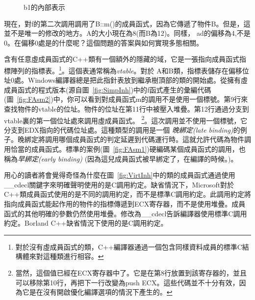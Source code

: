 \begin{figure}[tp]
\centering

\caption{{\code b1}的內部表示\label{fig:vtable}}
\end{figure}

現在，對{\code f}的第二次調用調用了{\code B::m()}的成員函式，因為它傳遞了物件{\code B}。但是，這並不是唯一的修改的地方。{\code A}的大小現在為8(而{\code B}為12)。同樣，{\code
ad}的偏移為4,不是0。在偏移0處是的什麼呢？這個問題的答案與如何實現多態相關。

 含有任意虛成員函式的C++類有一個額外的隱藏的域，它是一張指向成員函式指標陣列的指標表。\footnote{對於沒有虛成員函式的類，C++編譯器通過一個包含同樣資料成員的標準C結構體來對這種類進行相容。}。這個表通常稱為\emph{vtable}。對於
{\code A}和{\code B}類，指標表儲存在偏移位址0處。Windows編譯器總是把此指針表放到繼承樹頂部的類的開始處。從擁有虛成員函式的程式版本(源自圖~\ref{fig:SimpInh})中的{\code f}函式產生的彙編代碼(圖~\ref{fig:FAsm2})中，你可以看到對成員函式{\code m}的調用不是使用一個標號。第9行來查找物件的vtable的位址。物件的位址在第11行中被壓入堆疊。第12行通過分支到vtable裏的第一個位址處來調用虛成員函式。
\footnote{當然，這個值已經在{\code ECX}寄存器中了。它是在第8行放置到該寄存器的，並且可以移除第10行，再把下一行改變為push {\code ECX}。這些代碼並不十分有效，因為它是在沒有開啟優化編譯選項的情況下產生的。}。這次調用並不使用一個標號，它分支到{\code EDX}指向的代碼位址處。這種類型的調用是一個
\emph{晚綁定(late binding)}的例子。晚綁定將調用哪個成員函式的判定延遲到代碼運行時。這就允許代碼為物件調用恰當的成員函式。標準的案例(圖~\ref{fig:FAsm1})硬編碼某個成員函式的調用，也稱為\emph{早綁定(early binding)}
(因為這兒成員函式被早綁定了，在編譯的時候。)。

用心的讀者將會覺得奇怪為什麼在圖~\ref{fig:VirtInh}中的類的成員函式通過使用{\code \_\_cdecl}關鍵字來明確聲明使用的是C調用約定。缺省情況下，Microsoft對於C++類成員函式使用的是不同的調用約定，而不是標準C調用約定。此調用約定將指向成員函式能起作用的物件的指標傳遞到{\code ECX}寄存器，而不是使用堆疊。成員函式的其他明確的參數仍然使用堆疊。修改為{\code \_\_cdecl}告訴編譯器使用標準C調用約定。Borland C++缺省情況下使用的是C調用約定。

